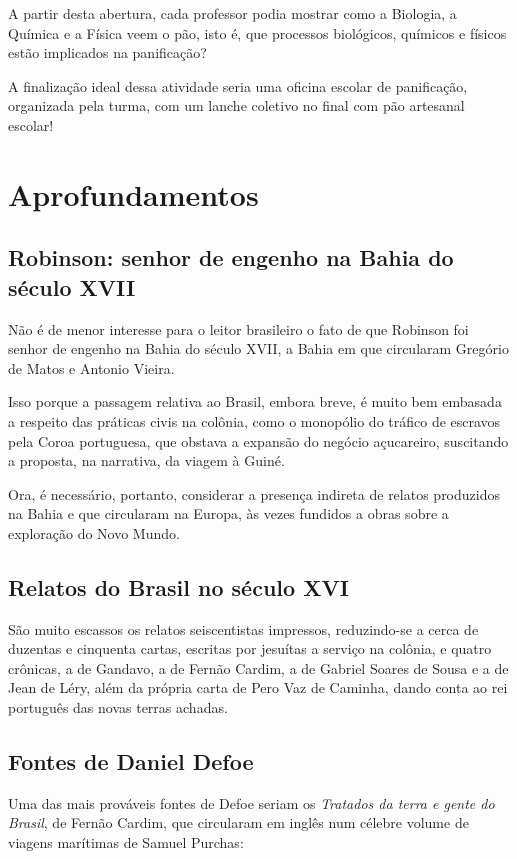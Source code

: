 \documentclass{article}
\begin{document}
A partir desta abertura, cada professor podia mostrar como a Biologia, a
Química e a Física veem o pão, isto é, que processos biológicos,
químicos e físicos estão implicados na panificação?

A finalização ideal dessa atividade seria uma oficina escolar de
panificação, organizada pela turma, com um lanche coletivo no final com
pão artesanal escolar!

\section{Aprofundamentos}

\subsection{Robinson: senhor de engenho na Bahia do século XVII}

Não é de menor interesse para o leitor brasileiro o fato de que Robinson
foi senhor de engenho na Bahia do século XVII, a Bahia em que circularam
Gregório de Matos e Antonio Vieira.

Isso porque a passagem relativa ao Brasil, embora breve, é muito bem
embasada a respeito das práticas civis na colônia, como o monopólio do
tráfico de escravos pela Coroa portuguesa, que obstava a expansão do
negócio açucareiro, suscitando a proposta, na narrativa, da viagem à
Guiné.

Ora, é necessário, portanto, considerar a presença indireta de relatos
produzidos na Bahia e que circularam na Europa, às vezes fundidos a
obras sobre a exploração do Novo Mundo.

\subsection{Relatos do Brasil no século XVI}

São muito escassos os relatos seiscentistas impressos, reduzindo-se a
cerca de duzentas e cinquenta cartas, escritas por jesuítas a serviço na
colônia, e quatro crônicas, a de Gandavo, a de Fernão Cardim, a de
Gabriel Soares de Sousa e a de Jean de Léry, além da própria carta de
Pero Vaz de Caminha, dando conta ao rei português das novas terras
achadas.

\subsection{Fontes de Daniel Defoe}

Uma das mais prováveis fontes de Defoe seriam os \emph{Tratados da terra
e gente do Brasil}, de Fernão Cardim, que circularam em inglês num
célebre volume de viagens marítimas de Samuel Purchas:
\end{document}
